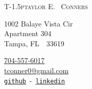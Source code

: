 \documentclass[12p4, letterpaper]{article}
\makeatletter
\def\myemail{tconner0@gmail.com}
\def\myphone{704-557-6017}
\def\myweb{tconners087}
\makeatother
\begin{document}
\reversemarginpar
\setlength\marginparwidth{0.85in}

\pagestyle{fancy} \setlength\headwidth{6.5in}
 \cfoot{}
\thispagestyle{empty}
\setlength{\headsep}{0.1625in}
\begin{adjustwidth}{-1in}{}
{\Huge
	{\textsc{%
		{T}\kern-1.5ptaylor
		{E}\kern-2pt.~%
		{C}onners}
	}
}
\medskip\medskip

{
	\begin{minipage}[b]{2in}
		\flushleft \footnotesize 
		1002 Balaye Vista Cir \\ 
		Apartment 304 \\ 
		Tampa, FL~~33619
	\end{minipage}
	\hfill
	\begin{minipage}[b]{1.2in}
		\flushright \footnotesize 
		\href{tel:\myphone}{\myphone} \\ %
		\href{mailto:\myemail}{\myemail} \\
		\href{https://www.github.com/\myweb}{\texttt{github}}~-~\href{https://www.linkedin.com/in/\myweb}{\texttt{linkedin}}
	\end{minipage}
}\par

\hrulefill
\end{adjustwidth}
\end{document}
